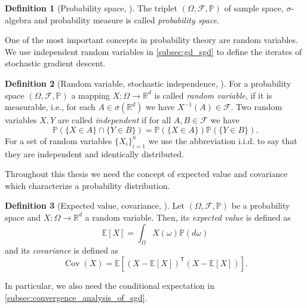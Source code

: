 \documentclass[12pt]{article}
\theoremstyle{definition}
\newtheorem{definition}[definition]{Definition}
\numberwithin{equation}{section}
\newcommand{\R}{\mathbb{R}}
\newcommand{\BP}{\mathbb{P}}
\newcommand{\CF}{\mathcal{F}}
\newcommand{\T}{\mathsf{T}}
\newcommand{\ev}[1]{\mathbb{E}\left[{#1}\right]}
\DeclareMathOperator{\Cov}{Cov}
\begin{document}
 \begin{definition}[Probability space, ]
   The triplet $(\Omega, \CF, \BP)$ of sample space, $\sigma$-algebra and probability measure is called \emph{probability space}.
 \end{definition}
 One of the most important concepts in probability theory are random variables. We use independent random variables in \autoref{subsec:gd_sgd} to define the iterates of stochastic gradient descent. 
 \begin{definition}[Random variable, stochastic independence, ]
  For a probability space $(\Omega, \CF, \BP)$ a mapping $X : \Omega \rightarrow \R^d$ is called \emph{random variable}, if it is measurable, i.e., for each $A \in \sigma(\R^d)$ we have $X^{-1}(A) \in \CF$.
  Two random variables $X, Y$ are called \emph{independent} if for all $A,B \in \CF$ we have
  \begin{equation*}
    \BP(\{X \in A\} \cap \{Y \in B\}) = \BP(\{X \in A\})\BP(\{Y \in B\}).
  \end{equation*}
  For a set of random variables $\{X_i\}_{i=1}^n$ we use the abbreviation i.i.d. to say that they are independent and identically distributed.
 \end{definition}
 Throughout this thesis we need the concept of expected value and covariance which characterize a probability distribution. 
 \begin{definition}[Expected value, covariance, ]
  Let $(\Omega, \CF, \BP)$ be a probability space and $X:\Omega \rightarrow \R^d$ a random variable. Then, its \emph{expected value} is defined as
  \begin{equation*}
    \ev{X} = \int_\Omega X(\omega) \BP(d\omega)
  \end{equation*}
  and its \emph{covariance} is defined as 
  \begin{equation*}
    \Cov (X) = \ev{(X - \ev{X})^\T (X - \ev{X})}.
  \end{equation*}
 \end{definition}
 In particular, we also need the conditional expectation in \autoref{subsec:convergence_analysis_of_sgd}.
\end{document}
